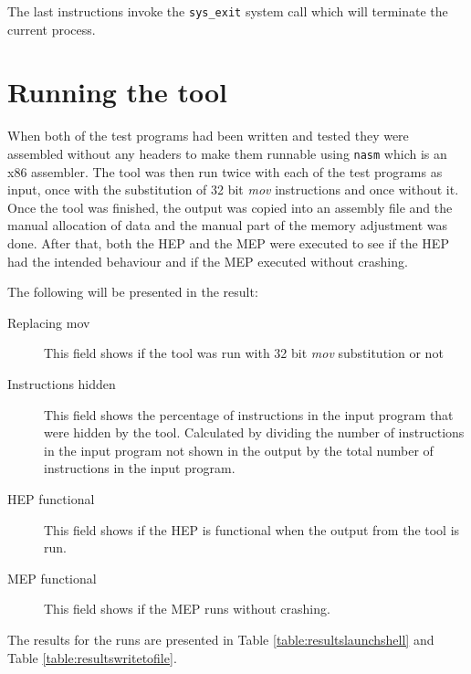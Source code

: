 \documentclass[11pt,twoside]{eitExjobb}
\begin{document}
\noindent The last instructions invoke the \texttt{sys\_exit} system call which will terminate the current process. 

\section{Running the tool}
When both of the test programs had been written and tested they were assembled without any headers to make them runnable using \texttt{nasm}\cite{nasm} which is an x86 assembler. The tool was then run twice with each of the test programs as input, once with the substitution of 32 bit \emph{mov} instructions and once without it. Once the tool was finished, the output was copied into an assembly file and the manual allocation of data and the manual part of the memory adjustment was done. After that, both the HEP and the MEP were executed to see if the HEP had the intended behaviour and if the MEP executed without crashing.

The following will be presented in the result:
\begin{description}
\item[Replacing mov] This field shows if the tool was run with 32 bit \emph{mov} substitution or not
\item[Instructions hidden] This field shows the percentage of instructions in the input program that were hidden by the tool. Calculated by dividing the number of instructions in the input program not shown in the output by the total number of instructions in the input program.
\item[HEP functional] This field shows if the HEP is functional when the output from the tool is run.
\item[MEP functional] This field shows if the MEP runs without crashing.
\end{description}

\noindent The results for the runs are presented in Table \ref{table:resultslaunchshell} and Table \ref{table:resultswritetofile}.
\end{document}
